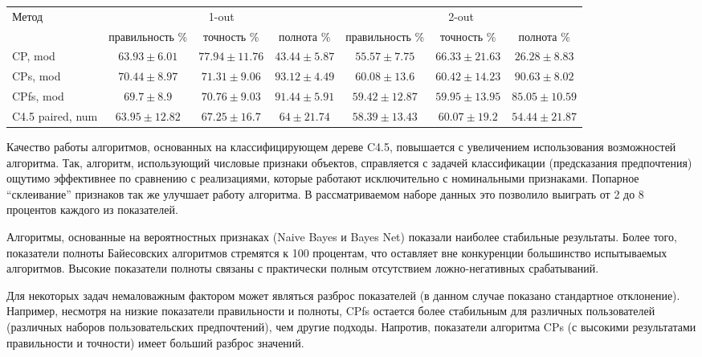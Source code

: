 \begin{sidewaystable}[ph!]
		\bigskip\bigskip
		
		\begin{tabular}{|l|ccc|ccc|}
			\hline
			\multirow{2}{*}{Метод}   & \multicolumn{3}{c|}{1-out}                             & \multicolumn{3}{c|}{2-out}         \\ \cline{2-7}  
			& правильность \%  & точность \%      & полнота \%       & правильность \%   & точность \%       & полнота \% \rule{0pt}{2.4ex} \\ \hline
			CP, mod    				 & $63.93 \pm 6.01$ & $77.94 \pm 11.76$  & $43.44 \pm 5.87$ & $55.57 \pm 7.75$  & $66.33 \pm 21.63$  & $26.28 \pm 8.83$ \rule{0pt}{2.4ex} \\ 
			CPs, mod				 & $70.44 \pm 8.97$  & $71.31 \pm 9.06$  & $93.12 \pm 4.49$ & $60.08 \pm 13.6$  & $60.42 \pm 14.23$  & $90.63 \pm 8.02$ \\
			CPfs, mod				 & $69.7 \pm 8.9$ & $70.76 \pm 9.03$ & $91.44 \pm 5.91$  & $59.42 \pm 12.87$   & $59.95 \pm 13.95$  & $85.05 \pm 10.59$ \\
			C4.5 paired, num 	     & $63.95 \pm 12.82$ & $67.25 \pm 16.7$ & $64 \pm 21.74$ & $58.39 \pm 13.43$  & $60.07 \pm 19.2$ & $54.44 \pm 21.87$ \\
			\hline
		\end{tabular}
		\label{tbl:sushi_results}
	\end{sidewaystable}
	Качество работы алгоритмов, основанных на классифицирующем дереве C4.5, повышается с увеличением использования возможностей алгоритма. Так, алгоритм, использующий числовые признаки объектов, справляется с задачей классификации (предсказания предпочтения) ощутимо эффективнее по сравнению с реализациями, которые работают исключительно с номинальными признаками. Попарное ``склеивание'' признаков так же улучшает работу алгоритма. В рассматриваемом наборе данных это позволило выиграть от 2 до 8 процентов каждого из показателей.
	
	Алгоритмы, основанные на вероятностных признаках (Naive Bayes и Bayes Net) показали наиболее стабильные результаты. Более того, показатели полноты Байесовских алгоритмов стремятся к 100 процентам, что оставляет вне конкуренции большинство испытываемых алгоритмов. Высокие показатели полноты связаны с практически полным отсутствием ложно-негативных срабатываний.
	
	Для некоторых задач немаловажным фактором может являться разброс показателей (в данном случае показано стандартное отклонение). Например, несмотря на низкие показатели правильности и полноты, CPfs остается более стабильным для различных пользователей (различных наборов пользовательских предпочтений), чем другие подходы. Напротив, показатели алгоритма CPs (с высокими результатами правильности и точности) имеет больший разброс значений.
	
